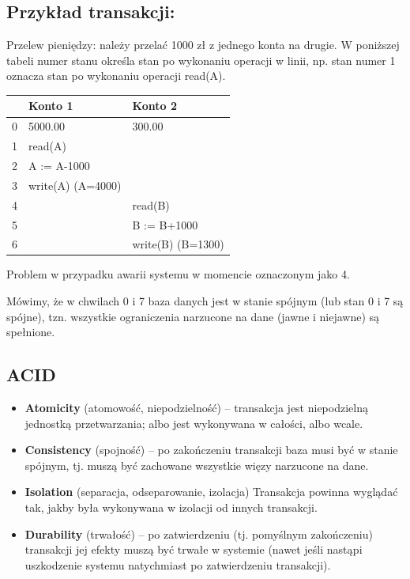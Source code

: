 \documentclass[12pt]{article}
\begin{document}
    \subsection{Przykład transakcji:}
    Przelew pieniędzy: należy przelać 1000 zł z jednego konta na drugie.
    W poniższej tabeli numer stanu określa stan po wykonaniu operacji w linii, np. stan numer 1
    oznacza stan po wykonaniu operacji read(A).
    
    \begin{table}[H]
    \begin{tabular}{|l|l|l|}
    \hline
      & Konto 1           & Konto 2           \\ \hline
    0 & 5000.00           & 300.00            \\ \hline
    1 & read(A)           &                   \\ \hline
    2 & A := A-1000       &                   \\ \hline
    3 & write(A) (A=4000) &                   \\ \hline
    4 &                   & read(B)           \\ \hline
    5 &                   & B := B+1000       \\ \hline
    6 &                   & write(B) (B=1300) \\ \hline
    \end{tabular}
    \end{table}
    
    Problem w przypadku awarii systemu w momencie oznaczonym jako 4.
    
    Mówimy, że w chwilach 0 i 7 baza danych jest w stanie spójnym (lub stan 0 i 7 są spójne), tzn.
    wszystkie ograniczenia narzucone na dane (jawne i niejawne) są spełnione.
    
    \subsection{ACID}
    \begin{itemize}
        \item \textbf{Atomicity} (atomowość, niepodzielność) – transakcja jest niepodzielną jednostką
        przetwarzania; albo jest wykonywana w całości, albo wcale.
        \item \textbf{Consistency} (spojność) – po zakończeniu transakcji baza musi być w stanie spójnym, tj. muszą
        być zachowane wszystkie więzy narzucone na dane.
        \item \textbf{Isolation} (separacja, odseparowanie, izolacja) Transakcja powinna wyglądać tak, jakby była
        wykonywana w izolacji od innych transakcji.
        \item \textbf{Durability} (trwałość) – po zatwierdzeniu (tj. pomyślnym zakończeniu) transakcji jej efekty
        muszą być trwałe w systemie (nawet jeśli nastąpi uszkodzenie systemu natychmiast po
        zatwierdzeniu transakcji).
    \end{itemize}
    
\end{document}
